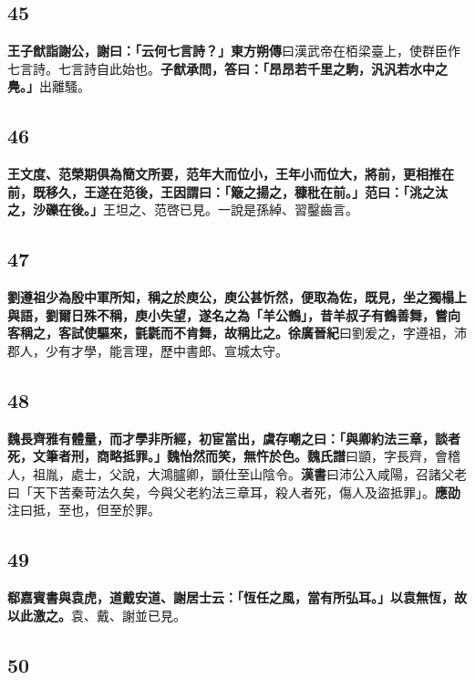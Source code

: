 \subsection*{45}

\textbf{王子猷詣謝公，謝曰：「云何七言詩？」}{\footnotesize \textbf{東方朔傳}曰漢武帝在栢梁臺上，使群臣作七言詩。七言詩自此始也。}\textbf{子猷承問，答曰：「昂昂若千里之駒，汎汎若水中之鳧。」}{\footnotesize 出離騷。}

\subsection*{46}

\textbf{王文度、范榮期俱為簡文所要，范年大而位小，王年小而位大，將前，更相推在前，既移久，王遂在范後，王因謂曰：「簸之揚之，穅秕在前。」范曰：「洮之汰之，沙礫在後。」}{\footnotesize 王坦之、范啓已見。一說是孫綽、習鑿齒言。}

\subsection*{47}

\textbf{劉遵祖少為殷中軍所知，稱之於庾公，庾公甚忻然，便取為佐，既見，坐之獨榻上與語，劉爾日殊不稱，庾小失望，遂名之為「羊公鶴」，昔羊叔子有鶴善舞，嘗向客稱之，客試使驅來，氃氋而不肯舞，故稱比之。}{\footnotesize \textbf{徐廣晉紀}曰劉爰之，字遵祖，沛郡人，少有才學，能言理，歷中書郎、宣城太守。}

\subsection*{48}

\textbf{魏長齊雅有體量，而才學非所經，初宦當出，虞存嘲之曰：「與卿約法三章，談者死，文筆者刑，商略抵罪。」魏怡然而笑，無忤於色。}{\footnotesize \textbf{魏氏譜}曰顗，字長齊，會稽人，祖胤，處士，父說，大鴻臚卿，顗仕至山陰令。\textbf{漢書}曰沛公入咸陽，召諸父老曰「天下苦秦苛法久矣，今與父老約法三章耳，殺人者死，傷人及盜抵罪」。\textbf{應劭}注曰抵，至也，但至於罪。}

\subsection*{49}

\textbf{郗嘉賓書與袁虎，道戴安道、謝居士云：「恆任之風，當有所弘耳。」以袁無恆，故以此激之。}{\footnotesize 袁、戴、謝並已見。}

\subsection*{50}

